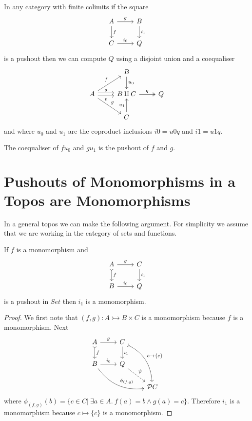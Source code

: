 \documentclass{article}
\begin{document}
In any category with finite colimits if the square
\begin{equation*}
  \begin{tikzcd}
   A \rar{g} \dar{f} & B\dar{i_1}\\
   C \rar{i_0} & Q
  \end{tikzcd}
\end{equation*}
is a pushout then we can compute $Q$ using a disjoint union and a coequaliser
\begin{equation*}
  \begin{tikzcd}
   {} & B \dar{u_0} & {}\\
   A \urar{f} \drar{g} \rar[yshift=0.5ex]{s} \rar[yshift=-0.5ex][swap]{t} & B\amalg C \rar[twoheadrightarrow]{q} & Q\\
   {} & C \uar{u_1} & {}
  \end{tikzcd}
\end{equation*}
and where $u_0$ and $u_1$ are the coproduct inclusions $i0=u0 q$ and $i1= u1 q$.

\begin{proposition}
  The coequaliser of $fu_0$ and $gu_1$ is the pushout of $f$ and $g$.
\end{proposition}

\section{Pushouts of Monomorphisms in a Topos are Monomorphisms}
\label{sec:pushouts-of-monomorphisms-are-monomorphisms}

In a general topos we can make the following argument.
For simplicity we assume that we are working in the category of sets and functions.

\begin{lemma}\label{lem:pushout-of-mono}
  If $f$ is a monomorphism and
  \begin{equation*}
    \begin{tikzcd}
     A \rar{g} \dar[rightarrowtail]{f} & C\dar{i_1}\\
     B \rar{i_0} & Q
    \end{tikzcd}
  \end{equation*}
  is a pushout in $Set$ then $i_1$ is a monomorphism.
  \begin{proof}
    We first note that $(f,g):A \rightarrowtail B\times C$ is a monomorphism because $f$ is a monomorphism.
    Next
    \begin{equation*}
      \begin{tikzcd}
       A \rar{g} \dar[rightarrowtail]{f} & C\dar{i_1} \arrow[bend left,rightarrowtail]{ddr}{c\mapsto \{c\}} & {}\\
       B \rar{i_0} \arrow[bend right]{rrd}{\phi_{(f,g)}} & Q \drar[dashed]{\psi} & {}\\
       {} & {} & \mathcal P C
      \end{tikzcd}
    \end{equation*}
    where $\phi_{(f,g)}(b)=\{c\in C|~\exists a\in A.~f(a)=b \wedge g(a)=c\}$.
    Therefore $i_1$ is a monomorphism because $c\mapsto \{c\}$ is a monomorphism.
  \end{proof}
\end{lemma}
\end{document}
